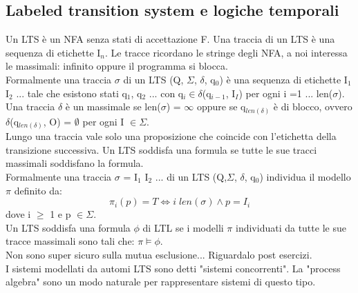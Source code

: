 \documentclass[12pt]{article}
\begin{document}
\subsection{Labeled transition system e logiche temporali} 
Un LTS è un NFA senza stati di accettazione F. Una traccia di un LTS è una sequenza di etichette I$_n$. Le tracce ricordano le stringe degli NFA, a noi interessa le massimali: infinito oppure il programma si blocca.
\\ Formalmente una traccia $\sigma$ di un LTS (Q, $\Sigma$, $\delta$, q$_0$) è una sequenza di etichette I$_1$ I$_2$ ... tale che esistono stati q$_1$, q$_2$ ... con q$_i \in \delta$(q$_{i-1}$, I$_I$) per ogni i =1 ... len($\sigma$).
\\ Una traccia $\delta$ è un massimale se len($\sigma$) = $\infty$ oppure se q$_{len(\delta)}$ è di blocco, ovvero $\delta$(q$_{len(\delta)}$, O) = $\emptyset$ per ogni I $\in \Sigma$.
\vspace{5mm} 
\\ Lungo una traccia vale solo una proposizione che coincide con l'etichetta della transizione successiva. Un LTS soddisfa una formula se tutte le sue tracci massimali soddisfano la formula.
\\ Formalmente una traccia $\sigma$ = I$_1$ I$_2$ ... di un LTS (Q,$\Sigma$, $\delta$, q$_0$) individua il modello $\pi$ definito da: 
\[
    \pi_i(p) = T \Longleftrightarrow i \; len(\sigma) \land p = I_i 
\]
dove i $\geq$ 1 e p $\in \Sigma$.
\\ Un LTS soddisfa una formula $\phi$ di LTL se i modelli $\pi$ individuati da tutte le sue tracce massimali sono tali che: $\pi \models \phi$.
\\ Non sono super sicuro sulla mutua esclusione... Riguardalo post esercizi.
\\ I sistemi modellati da automi LTS sono detti "sistemi concorrenti". La "process algebra" sono un modo naturale per rappresentare sistemi di questo tipo.
\end{document}
